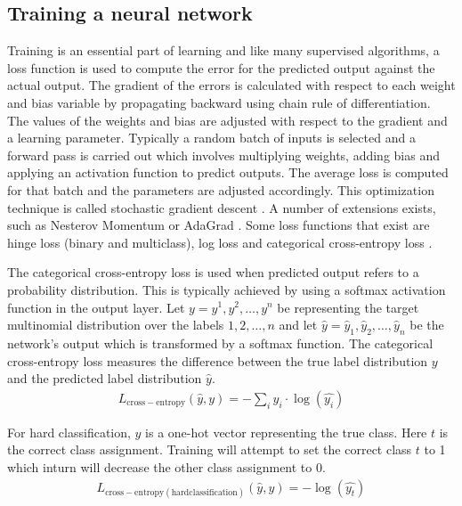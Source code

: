 \documentclass[a4paper, 11pt]{article}
\begin{document}
\subsection{Training a neural network}

Training is an essential part of learning and like many supervised algorithms, a loss function is used to compute the error for the predicted output against the actual output. The gradient of the errors is calculated with respect to each weight and bias variable by propagating backward using chain rule of differentiation. The values of the weights and bias are adjusted with respect to the gradient and a learning parameter. Typically a random batch of inputs is selected and a forward pass is carried out which involves multiplying weights, adding bias and applying an activation function to predict outputs. The average loss is computed for that batch and the parameters are adjusted accordingly. This optimization technique is called stochastic gradient descent \parencite{Bottou2012}. A number of extensions exists, such as Nesterov Momentum \parencite{Sutskever2013} or AdaGrad \parencite{Duchi2011}. Some loss functions that exist are hinge loss (binary and multiclass), log loss and categorical cross-entropy loss \parencite{Goldberg2016}. 


The categorical cross-entropy loss is used when predicted output refers to a probability distribution. This is typically achieved by using a softmax activation function in the output layer. Let $y = y^{1}, y^{2}, \dots, y^{n}$ be representing the target multinomial distribution over the labels $1,2,\dots,n$ and let $ \hat{y} = \hat{y}_{1},\hat{y}_{2},\dots,\hat{y}_{n}$ be the network's output which is transformed by a softmax function. The categorical cross-entropy loss measures the difference between the true label distribution $y$ and the predicted label distribution $\hat{y}$. 
\begin{align*}
L_\mathrm{cross-entropy}(\hat{y},y) = -\sum_iy_i \cdot \log(\hat{y_i})
\end{align*}

For hard classification, $y$ is a one-hot vector representing the true class. Here $t$ is the correct class assignment. Training will attempt to set the correct class $t$ to 1 which inturn will decrease the other class assignment to 0.
\begin{align*}
L_{\mathrm{cross-entropy(hard classification)}}(\hat{y},y) = -\log(\hat{y_t})
\end{align*}
\end{document}

